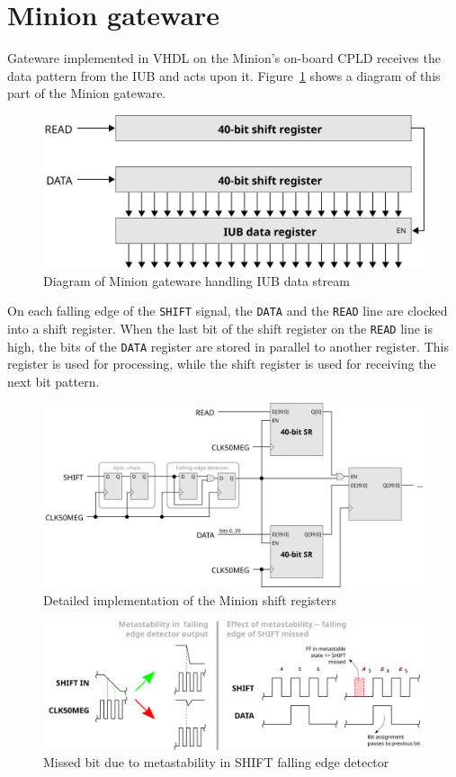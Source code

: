 \documentclass[a4paper,11pt]{article}
\begin{document}
\section{Minion gateware}
\label{sec:minion}

Gateware implemented in VHDL on the Minion's on-board CPLD receives the data pattern
from the IUB and acts upon it. Figure~\ref{fig:minion-hdl} shows a diagram of this
part of the Minion gateware.

\begin{figure}[b]
  \centerline{\includegraphics[width=.75\textwidth]{fig/minion-hdl}}
  \caption{\label{fig:minion-hdl} Diagram of Minion gateware handling IUB data stream}
\end{figure}

On each falling edge of the \verb=SHIFT= signal, the \verb=DATA= and the \verb=READ= line 
are clocked into a shift register. When the last bit of the shift register on the 
\verb=READ= line is high, the bits of the \verb=DATA= register are stored in parallel to 
another register. This register is used for processing, while the shift register is used 
for receiving the next bit pattern.

\begin{figure}
  \centerline{\includegraphics[width=.95\textwidth]{fig/minion-hdl-detail}}
  \caption{\label{fig:minion-hdl-detail} Detailed implementation of the Minion shift     
           registers}
\end{figure}

\begin{figure}[b]
  \centerline{\includegraphics[width=\textwidth]{fig/missed-bit}}
  \caption{\label{fig:missed-bit} Missed bit due to metastability in SHIFT falling edge
  detector}
\end{figure}
\end{document}
